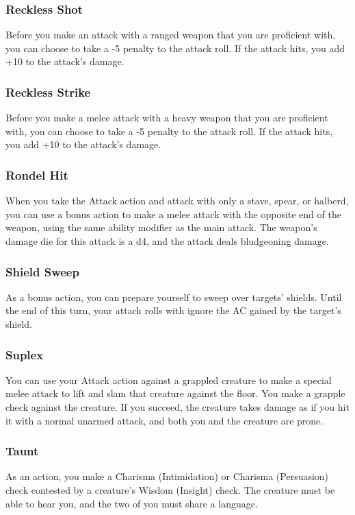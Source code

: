 \subsubsection{Reckless Shot} \label{tec::recklessshot}
Before you make an attack with a ranged weapon that you are proficient with, you can choose to take a -5 penalty to the attack roll.
If the attack hits, you add +10 to the attack's damage.

\subsubsection{Reckless Strike} \label{tec::recklessstrike}
Before you make a melee attack with a heavy weapon that you are proficient with, you can choose to take a -5 penalty to the attack roll.
If the attack hits, you add +10 to the attack's damage.

\subsubsection{Rondel Hit} \label{tec::rondelhit}
When you take the Attack action and attack with only a stave, spear, or halberd, you can use a bonus action to make a melee attack with the opposite end of the weapon, using the same ability modifier as the main attack.
The weapon's damage die for this attack is a d4, and the attack deals bludgeoning damage.

\subsubsection{Shield Sweep} \label{tec::shieldsweep}
As a bonus action, you can prepare yourself to sweep over targets' shields.
Until the end of this turn, your attack rolls with ignore the AC gained by the target's shield.

\subsubsection{Suplex} \label{tec::suplex}
You can use your Attack action against a grappled creature to make a special melee attack to lift and slam that creature against the floor.
You make a grapple check against the creature.
If you succeed, the creature takes damage as if you hit it with a normal unarmed attack, and both you and the creature are prone.

\subsubsection{Taunt} \label{tec::taunt}
As an action, you make a Charisma (Intimidation) or Charisma (Persuasion) check contested by a creature's Wisdom (Insight) check.
The creature must be able to hear you, and the two of you must share a language.

